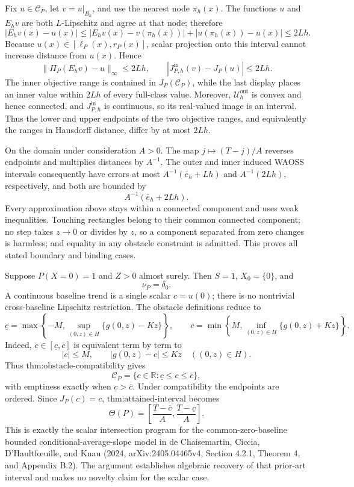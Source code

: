Fix \(u\in\mathcal C_P\), let \(v=u|_{B_h}\), and use the nearest node \(\pi_h(x)\).  The functions \(u\) and \(E_hv\) are both \(L\)-Lipschitz and agree at that node; therefore
\[
 |E_hv(x)-u(x)|
 \leq|E_hv(x)-v(\pi_h(x))|+|u(\pi_h(x))-u(x)|
 \leq2Lh.
\]
Because \(u(x)\in[\ell_P(x),r_P(x)]\), scalar projection onto this interval cannot increase distance from \(u(x)\).  Hence
\[
 \|\Pi_P(E_hv)-u\|_\infty\leq2Lh,
 \qquad
 |J_{P,h}^{\mathrm{in}}(v)-J_P(u)|\leq2Lh.
\]
The inner objective range is contained in \(J_P(\mathcal C_P)\), while the last display places an inner value within \(2Lh\) of every full-class value.  Moreover, \(\mathcal U_h^{\mathrm{out}}\) is convex and hence connected, and \(J_{P,h}^{\mathrm{in}}\) is continuous, so its real-valued image is an interval.  Thus the lower and upper endpoints of the two objective ranges, and equivalently the ranges in Hausdorff distance, differ by at most \(2Lh\).

On the domain under consideration \(A>0\).  The map \(j\mapsto(T-j)/A\) reverses endpoints and multiplies distances by \(A^{-1}\).  The outer and inner induced WAOSS intervals consequently have errors at most \(A^{-1}(\bar e_h+Lh)\) and \(A^{-1}(2Lh)\), respectively, and both are bounded by
\[
 A^{-1}(\bar e_h+2Lh).
\]
Every approximation above stays within a connected component and uses weak inequalities.  Touching rectangles belong to their common connected component; no step takes \(z\to0\) or divides by \(z\), so a component separated from zero changes is harmless; and equality in any obstacle constraint is admitted.  This proves all stated boundary and binding cases.

Suppose \(P(X=0)=1\) and \(Z>0\) almost surely.  Then \(S=1\), \(X_0=\{0\}\), and
\[
 \nu_P=\delta_0.
\]
A continuous baseline trend is a single scalar \(c=u(0)\); there is no nontrivial cross-baseline Lipschitz restriction.  The obstacle definitions reduce to
\[
 \underline c
 =\max\left\{-M,\sup_{(0,z)\in H}\{g(0,z)-Kz\}\right\},
 \qquad
 \overline c
 =\min\left\{M,\inf_{(0,z)\in H}\{g(0,z)+Kz\}\right\}.
\]
Indeed, \(c\in[\underline c,\overline c]\) is equivalent term by term to
\[
 |c|\leq M,
 \qquad
 |g(0,z)-c|\leq Kz
 \quad((0,z)\in H).
\]
Thus \(\text{thm:obstacle-compatibility}\) gives
\[
 \mathcal C_P=\{c\in\mathbb R:\underline c\leq c\leq\overline c\},
\]
with emptiness exactly when \(\underline c>\overline c\).  Under compatibility the endpoints are ordered.  Since \(J_P(c)=c\), \(\text{thm:attained-interval}\) becomes
\[
 \Theta(P)=
 \left[\frac{T-\overline c}{A},
       \frac{T-\underline c}{A}\right].
\]
This is exactly the scalar intersection program for the common-zero-baseline bounded conditional-average-slope model in de Chaisemartin, Ciccia, D'Haultf\oe{}uille, and Knau (2024, arXiv:2405.04465v4, Section 4.2.1, Theorem 4, and Appendix B.2).  The argument establishes algebraic recovery of that prior-art interval and makes no novelty claim for the scalar case.


